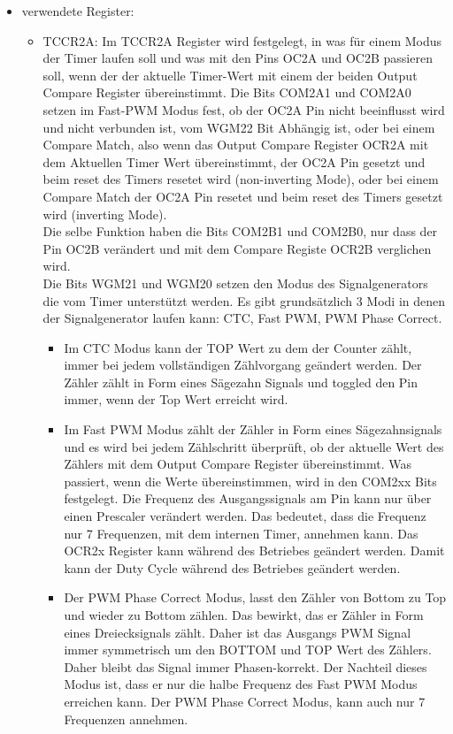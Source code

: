 \begin{itemize}
\item verwendete Register:
\begin{itemize}
\item TCCR2A: Im TCCR2A Register wird festgelegt, in was für einem Modus der Timer laufen soll und was mit den Pins OC2A und OC2B passieren soll, wenn der der aktuelle Timer-Wert mit einem der beiden Output Compare Register übereinstimmt. Die Bits COM2A1 und COM2A0 setzen im Fast-PWM Modus fest, ob der OC2A Pin nicht beeinflusst wird und nicht verbunden ist, vom WGM22 Bit Abhängig ist, oder bei einem Compare Match, also wenn das Output Compare Register OCR2A mit dem Aktuellen Timer Wert übereinstimmt, der OC2A Pin gesetzt und beim reset des Timers resetet wird (non-inverting Mode), oder bei einem Compare Match der OC2A Pin resetet und beim reset des Timers gesetzt wird (inverting Mode). \\ Die selbe Funktion haben die Bits COM2B1 und COM2B0, nur dass der Pin OC2B verändert und mit dem Compare Registe OCR2B verglichen wird. \\
Die Bits WGM21 und WGM20 setzen den Modus des Signalgenerators die vom Timer unterstützt werden. Es gibt grundsätzlich 3 Modi in denen der Signalgenerator laufen kann: CTC, Fast PWM, PWM Phase Correct. \\
\begin{itemize}
\item Im CTC Modus kann der TOP Wert zu dem der Counter zählt, immer bei jedem vollständigen Zählvorgang geändert werden. Der Zähler zählt in Form eines Sägezahn Signals und toggled den Pin immer, wenn der Top Wert erreicht wird.\\
\item Im Fast PWM Modus zählt der Zähler in Form eines Sägezahnsignals und es wird bei jedem Zählschritt überprüft, ob der aktuelle Wert des Zählers mit dem Output Compare Register übereinstimmt. Was passiert, wenn die Werte übereinstimmen, wird in den COM2xx Bits festgelegt. Die Frequenz des Ausgangssignals am Pin kann nur über einen Prescaler verändert werden. Das bedeutet, dass die Frequenz nur 7 Frequenzen, mit dem internen Timer, annehmen kann. Das OCR2x Register kann während des Betriebes geändert werden. Damit kann der Duty Cycle während des Betriebes geändert werden. \\
\item Der PWM Phase Correct Modus, lasst den Zähler von Bottom zu Top und wieder zu Bottom zählen. Das bewirkt, das er Zähler in Form eines Dreiecksignals zählt. Daher ist das Ausgangs PWM Signal immer symmetrisch um den BOTTOM und TOP Wert des Zählers. Daher bleibt das Signal immer Phasen-korrekt. Der Nachteil dieses Modus ist, dass er nur die halbe Frequenz des Fast PWM Modus erreichen kann. Der PWM Phase Correct Modus, kann auch nur 7 Frequenzen annehmen.\\

\end{itemize}
\end{itemize}
\end{itemize}
